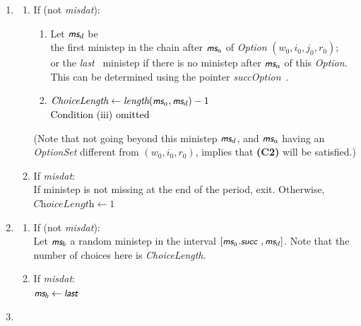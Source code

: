 \documentclass[a4paper,12pt,fleqn]{article}
\newcommand{\nnm}[1]{\textsf{\small\textit{#1}\ }}
\newcommand{\ms}{\textsl{\textsf{\small ms}}} %
\newcommand{\addcc}[1]{{\textcolor[named]{Black}{#1}}}
\begin{document}
\begin{enumerate}
\item \begin{enumerate}
      \item If (not \textit{misdat}):
             \begin{enumerate}
              \item             Let $\ms_d$ be \\
                the first ministep in the chain after $\ms_a$
                of \textit{Option} $(w_0,i_0,j_0,r_0)$; \\
                or the \nnm{last} ministep
                if there is no ministep after $\ms_a$ of this \textit{Option}.\\
                This can be determined using the pointer \nnm{succOption}.
             \item    $\textit{ChoiceLength} \leftarrow \textit{length}(\ms_a, \ms_d ) - 1$
                \\ \addcc{Condition (iii) omitted }
             \end{enumerate}
            (Note that not going beyond this ministep $\ms_d$,
            and $\ms_a$ having an \textit{OptionSet} different
            from $(w_0, i_0, r_0)$,
            implies that \textbf{(C2)} will be satisfied.)
      \item If \textit{misdat}:\\
        If ministep is not missing at the end of the period, exit. Otherwise,
        $\textit{ChoiceLength} \leftarrow 1 $
      \end{enumerate}
\item \begin{enumerate}
       \item  If (not \textit{misdat}):\\
               Let $\ms_b$ a random ministep in the interval $[\ms_a.\nnm{succ}, \ms_d ]$.
              Note that the number of choices here is \textit{ChoiceLength}.
       \item  If \textit{misdat}:\\
              $\ms_b \leftarrow \nnm{last}$
       \end{enumerate}
\item \begin{enumerate}

\end{enumerate}
\end{enumerate}
\end{document}
